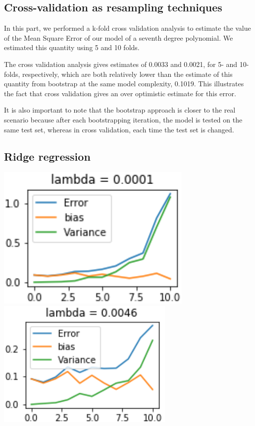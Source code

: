 \documentclass{article}
\begin{document}
\subsection{Cross-validation as resampling techniques}
In this part, we performed a k-fold cross validation analysis to estimate the value of the Mean Square Error of our model of a seventh degree polynomial. We estimated this quantity using 5 and 10 folds.

The cross validation analysis gives estimates of 0.0033 and 0.0021, for 5- and 10-folds, respectively, which are both relatively lower than the estimate of this quantity from bootstrap at the same model complexity, 0.1019. This illustrates the fact that cross validation gives an over optimistic estimate for this error.

It is also important to note that the bootstrap approach is closer to the real scenario because after each bootstrapping iteration, the model is tested on the same test set, whereas in cross validation, each time the test set is changed.


\subsection{Ridge regression}
\includegraphics[scale=1]{boostrapridge0.png}
\includegraphics[scale=1]{boostrapridge1.png}
\end{document}
